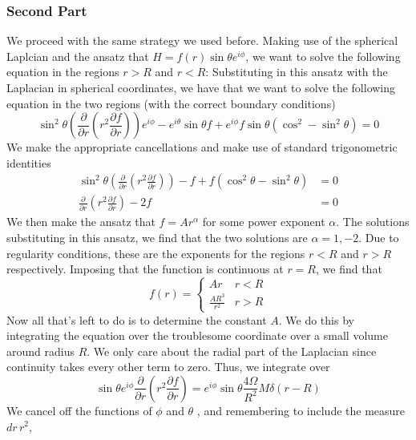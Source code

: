 \documentclass[11pt, a4paper]{article}   	%
\theoremstyle{slplain}
\begin{document}
\subsubsection{Second Part} 
We proceed with the same strategy we used before. 
Making use of the spherical Laplcian and 
the ansatz that $ H = f ( r ) \sin \theta e ^{ i \phi } $, 
we want to solve the following equation 
in the regions $ r  > R $ and $ r < R $: 
Substituting in this ansatz with the Laplacian in spherical 
coordinates, we have that we want to solve the following 
equation in the two regions (with the correct boundary conditions)
\[
\sin ^ 2 \theta \left( \frac{\partial  }{\partial  r }  \left(  r ^ 2 \frac{\partial  f }{\partial  r }   \right) \right) e ^{ i \phi  }  - e ^{ i \theta } \sin \theta f + e ^{ i \phi } f \sin \theta 
\left( \cos ^ 2  - \sin ^ 2 \theta  \right)  = 0 
\] 
We make the appropriate cancellations 
and make use of standard trigonometric 
identities 
\begin{align*} 
\sin ^ 2 \theta \left(  \frac{\partial  }{\partial  r }  \left(  r ^ 2 \frac{\partial  f }{\partial  r }   \right)   \right)   - f + f \left(  \cos ^ 2 \theta  - \sin ^ 2 \theta  \right)   &= 0 \\ 
\frac{\partial  }{\partial  r  }  \left( r ^ 2 \frac{\partial  f }{\partial  r }   \right)   - 2f  & = 0 
\end{align*} 
We then make the ansatz that $ f = A r ^{ \alpha } $ for some power exponent 
$ \alpha $. The solutions substituting in this ansatz, we 
find that the two solutions are $ \alpha = 1, -2 $. Due to 
regularity conditions, these are the exponents for the regions 
$ r < R $ and $ r > R $ respectively. Imposing that 
the function is continuous at  $ r  = R $, 
we find that 
\[
f\left(   r  \right)  = \begin{cases}
A r & r < R \\ 
\frac{ A R ^ 3}{ r ^ 2  } & r > R 
\end{cases}
\] Now all that's left to do is to determine the constant $ A $. 
We do this by integrating the equation over 
the troublesome coordinate over a small 
volume around radius $ R $. We only care about the 
radial part of the Laplacian since 
continuity takes every other term to zero. 
Thus, we integrate over 
\[
\sin \theta e ^{ i \phi } \frac{\partial  }{\partial  r }  \left( r ^ 2 
\frac{\partial  f }{\partial  r }  \right)   =  e^{ i \phi } \sin \theta 
\frac{ 4 \Omega }{ R ^ 2 } M \delta \left( r - R  \right)   
\]   We cancel off the functions of $ \phi $ and $ \theta $
, and remembering to include the measure $ dr \, r ^ 2 $, 
\end{document}
